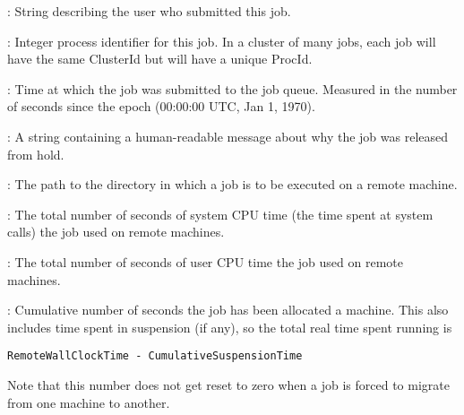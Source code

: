 \begin{description}
\item[\AdAttr{Owner}] : String describing the user who submitted this
job.

\item[\AdAttr{ProcId}] : Integer process identifier for this job.  In
a cluster of many jobs, each job will have the same ClusterId but will
have a unique ProcId.

\item[\AdAttr{QDate}] : Time at which the job was submitted to the job
queue.  Measured in the
number of seconds since the epoch (00:00:00 UTC, Jan 1, 1970).

\item[\AdAttr{ReleaseReason}] :    A string containing a human-readable
message about why the job was released from hold.

\item[\AdAttr{RemoteIwd}] : The path to the directory in which
a job is to be executed on a remote machine.

\item[\AdAttr{RemoteSysCpu}] : The total number of seconds
of system CPU time (the time spent at system calls) the job used
on remote machines.

\item[\AdAttr{RemoteUserCpu}] : The total number of seconds
of user CPU time the job used on remote machines.

\item[\AdAttr{RemoteWallClockTime}] : Cumulative number of seconds
the job has been allocated a machine.
This also includes time spent in suspension (if any),
so the total real time spent running is 
\begin{verbatim}
RemoteWallClockTime - CumulativeSuspensionTime
\end{verbatim}
Note that this number does not get reset to
zero when a job is forced to migrate from one machine to another.


\end{description}
